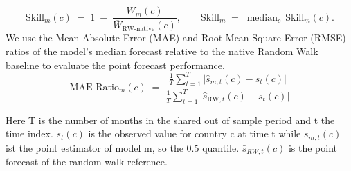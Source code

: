 \begin{equation}
  \mathrm{Skill}_m(c) \;=\; 1 \;-\;
  \frac{\overline{W}_m(c)}{\overline{W}_{\mathrm{RW\text{-}native}}(c)},
  \qquad
  \mathrm{Skill}_m \;=\; \operatorname{median}_{c}\,\mathrm{Skill}_m(c).
  \label{eq:skill}
\end{equation}
We use the Mean Absolute Error (MAE) and Root Mean Square Error (RMSE) ratios of the model's median forecast relative to the native Random Walk baseline to evaluate the point forecast performance. 
\begin{equation}
  \mathrm{MAE\text{-}Ratio}_m(c) \;=\; \frac{\frac{1}{T}\sum_{t=1}^T \big| \hat{s}_{m,t}(c) - s_{t}(c) \big|}{\frac{1}{T}\sum_{t=1}^T \big| \hat{s}_{\mathrm{RW},t}(c) - s_{t}(c) \big|}
  \label{eq:mae_ratio}
\end{equation}


\noindent Here T is the number of months in the shared out of sample period and t the time index. $s_t(c)$ is the observed value for country c at time t while $\bar{s}_{m,t}(c)$ ist the point estimator of model m, so the 0.5 quantile. $\bar{s}_{RW,t}(c)$ is the point forecast of the random walk reference.


